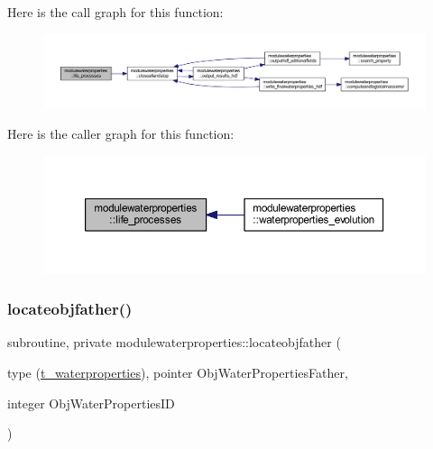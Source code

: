 Here is the call graph for this function\+:\nopagebreak
\begin{figure}[H]
\begin{center}
\leavevmode
\includegraphics[width=350pt]{namespacemodulewaterproperties_ad72c8ac146887990ee173526b0a484f1_cgraph}
\end{center}
\end{figure}
Here is the caller graph for this function\+:\nopagebreak
\begin{figure}[H]
\begin{center}
\leavevmode
\includegraphics[width=350pt]{namespacemodulewaterproperties_ad72c8ac146887990ee173526b0a484f1_icgraph}
\end{center}
\end{figure}
\mbox{\label{namespacemodulewaterproperties_abe99a26b781f6af9708e4db390fcdcba}} 
\subsubsection{\texorpdfstring{locateobjfather()}{locateobjfather()}}
{\footnotesize\ttfamily subroutine, private modulewaterproperties\+::locateobjfather (\begin{DoxyParamCaption}\item[{type (\mbox{\hyperlink{structmodulewaterproperties_1_1t__waterproperties}{t\+\_\+waterproperties}}), pointer}]{Obj\+Water\+Properties\+Father,  }\item[{integer}]{Obj\+Water\+Properties\+ID }\end{DoxyParamCaption})\hspace{0.3cm}{\ttfamily [private]}}

